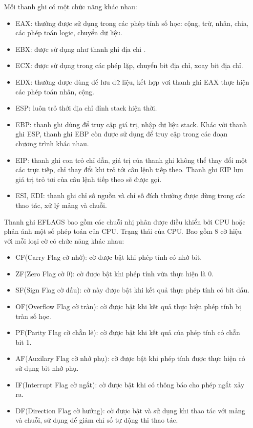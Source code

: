 	Mỗi thanh ghi có một chức năng khác nhau: 
\begin{itemize}
	\renewcommand{\labelitemi}{\textbullet}
	\item	EAX: thường được sử dụng trong các phép tính số học: cộng, trừ, nhân, chia, các phép toán logic, chuyển dữ liệu.
	\item EBX: được sử dụng như thanh ghi địa chỉ .
\item	ECX: được sử dụng trong các phép lặp, chuyển bit địa chỉ, xoay bit địa chỉ.
\item	EDX: thường được dùng để lưu dữ liệu, kết hợp vơi thanh ghi EAX thực hiện các phép toán nhân, cộng.
\item	ESP: luôn trỏ thới địa chỉ đỉnh stack hiện thời.
\item	EBP: thanh ghi dùng để truy cập giá trị, nhập dữ liệu stack. Khác với thanh ghi ESP, thanh ghi EBP còn được sử dụng để truy cập trong các đoạn chương trình khác nhau.
\item	EIP: thanh ghi con trỏ chỉ dẫn, giá trị của thanh ghi không thể thay đổi một các trực tiếp, chỉ thay đổi khi trỏ tới câu lệnh tiếp theo. Thanh ghi EIP lưu giá trị trỏ tơi của câu lệnh tiếp theo sẽ được gọi. 
\item	ESI, EDI: thanh ghi chỉ số nguồn và chỉ số đích thường được dùng trong các thao tác, xử lý mảng và chuỗi.
\end{itemize}	
	
	Thanh ghi EFLAGS bao gồm các chuỗi nhị phân được điều khiển bởi CPU hoặc phản ánh một số phép toán của CPU. Trạng thái của CPU. Bao gồm 8 cờ hiệu với mỗi loại cờ có chức năng khác nhau:
\begin{itemize}
	\renewcommand{\labelitemi}{\textbullet}		
		\item CF(Carry Flag cờ nhớ): cờ được bật khi phép tính có nhớ bit.
		\item ZF(Zero Flag cờ 0): cờ được bật khi phép tính vừa thực hiện là 0.
\item SF(Sign Flag cờ dấu): cờ này được bật khi kết quả thực phép tính có bit dấu.
\item	OF(Overflow Flag cờ tràn): cờ được bật khi kết quả thực hiện phép tính bị tràn số học.
\item	PF(Parity Flag cờ chẵn lẽ): cờ được bật khi kết quả của phép tính có chẵn bit 1.
\item	AF(Auxilary Flag cờ nhớ phụ): cờ được bật khi phép tính được thực hiện có sử dụng bit nhớ phụ.
\item IF(Interrupt Flag cờ ngắt): cờ được bật khi có thông báo cho phép ngắt xảy ra.
\item DF(Direction Flag cờ hướng): cờ được bật và sử dụng khi thao tác với mảng và chuỗi, sử dụng để giảm chỉ số tự động thi thao tác.
\end{itemize}	

